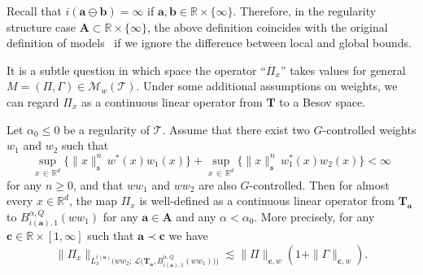 \documentclass[AHL,Unicode,longabstracts,published]{cedram}
\newcommand{\bbR}{\mathbb{R}}
\newcommand{\mfs}{\mathfrak{s}}
\newcommand{\wco}{w^*}
\newcommand{\bfa}{\mathbf{a}}
\newcommand{\bfb}{\mathbf{b}}
\newcommand{\bfc}{\mathbf{c}}
\newcommand{\bfaob}{\mathbf{a}\ominus\mathbf{b}}
\newcommand{\bfA}{\mathbf{A}}
\newcommand{\bfT}{\mathbf{T}}
\newcommand{\mcL}{\mathcal{L}}
\newcommand{\scT}{\mathscr{T}}
\newcommand{\scM}{\mathscr{M}}
\begin{document}
Recall that $i(\bfaob)=\infty$ if $\bfa,\bfb\in\bbR\times\{\infty\}$. Therefore, in the regularity structure case $\bfA\subset\bbR\times\{\infty\}$, the above definition coincides with the original definition of models~\cite[Definition~2.17]{Hai14} if we ignore the difference between local and global bounds.


It is a subtle question in which space the operator ``$\Pi_x$'' takes values for general $M=(\Pi,\Gamma)\in\scM_w(\scT)$. Under some additional assumptions on weights, we can regard $\Pi_x$ as a continuous linear operator from $\bfT$ to a Besov space.

\begin{prop}\label{prop:whatisPixtau}
Let $\alpha_0\le0$ be a regularity of $\scT$. Assume that there exist two $G$-controlled weights $w_1$ and $w_2$ such that
\[
\sup_{x\,\in\,\bbR^d}\big\{\|x\|_\mfs^n\,\wco(x)w_1(x)\big\} +\sup_{x\,\in\,\bbR^d}\big\{\|x\|_\mfs^n\,\wco_1(x)w_2(x)\big\} <\infty
\]
for any $n\ge0$, and that $ww_1$ and $ww_2$ are also $G$-controlled. Then for almost every $x\in\bbR^d$, the map $\Pi_x$ is well-defined as a continuous linear operator from $\bfT_{\bfa}$ to $B_{i(\bfa),1}^{\alpha,Q}(ww_1)$ for any $\bfa\in\bfA$ and any $\alpha<\alpha_0$. More precisely, for any $\bfc\in\bbR\times[1,\infty]$ such that $\bfa\prec\bfc$ we have
\[
\|\Pi_x\|_{L_x^{i(\bfa)}\big(ww_2;\,\mcL\big(\bfT_\bfa,B_{i(\bfa),1}^{\alpha,Q}(ww_1)\big)\big)}
\lesssim\|\Pi\|_{\bfc,w}(1+\|\Gamma\|_{\bfc,w}).
\]
\end{prop}
\end{document}
